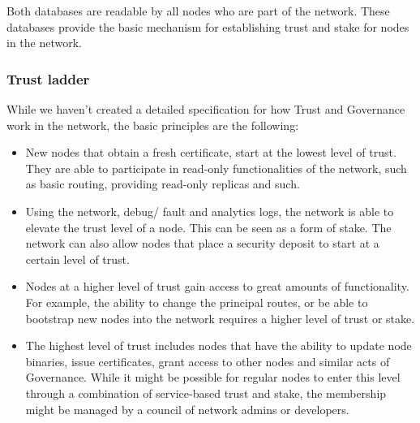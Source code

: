 Both databases are readable by all nodes who are part of the network. These databases provide the basic mechanism for
establishing trust and stake for nodes in the network.

\subsubsection{Trust ladder}
While we haven't created a detailed specification for how Trust and Governance work in the network, the basic principles
are the following:
\begin{itemize}
    \item New nodes that obtain a fresh certificate, start at the lowest level of trust. They are able to participate in
        read-only functionalities of the network, such as basic routing, providing read-only replicas and such.
    \item Using the network, debug/ fault and analytics logs, the network is able to elevate the trust level of a node.
        This can be seen as a form of stake. The network can also allow nodes that place a security deposit to start at
        a certain level of trust.
    \item Nodes at a higher level of trust gain access to great amounts of functionality. For example, the ability to
        change the principal routes, or be able to bootstrap new nodes into the network requires a higher level of trust
        or stake.
    \item The highest level of trust includes nodes that have the ability to update node binaries, issue certificates,
        grant access to other nodes and similar acts of Governance. While it might be possible for regular nodes to
        enter this level through a combination of service-based trust and stake, the membership might be managed by a
        council of network admins or developers.
\end{itemize}
